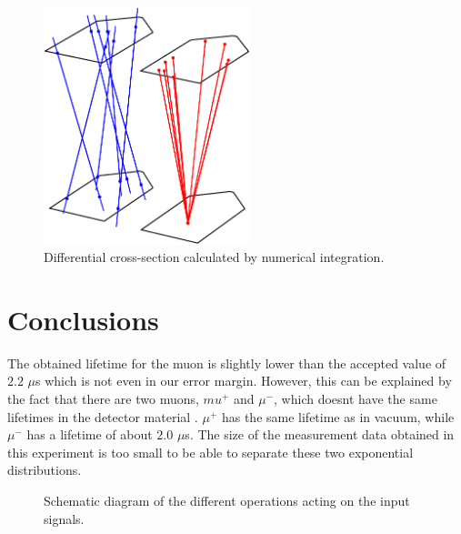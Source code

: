 \documentclass[10pt,twocolumn]{article}
\begin{document}
\begin{figure}
\centering
\includegraphics[width=6cm]{mc-crop.pdf}
\caption{Differential cross-section calculated by numerical integration.}
\label{cc}
\end{figure}

\section{Conclusions}
The obtained lifetime for the muon is slightly lower than the accepted value of $2.2$ $\mu$s which is not even in our error margin. However, this can be explained by the fact that there are two muons, $mu^+$ and $\mu^-$, which doesnt have the same lifetimes in the detector material \cite{}. $\mu^+$ has the same lifetime as in vacuum, while $\mu^-$ has a lifetime of about $2.0$ $\mu$s. The size of the measurement data obtained in this experiment is too small to be able to separate these two exponential distributions.




\begin{figure}[h]

\caption{\label{setup} Schematic diagram of the different operations acting on the input signals.}
\end{figure}
\end{document}
